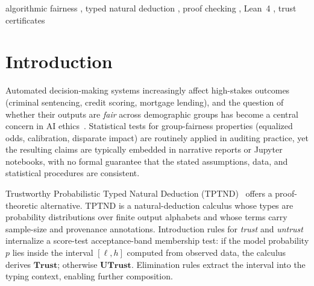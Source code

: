 \documentclass{ceurart}
\newcommand{\Trust}{\textbf{Trust}}
\newcommand{\UTrust}{\textbf{UTrust}}
\begin{document}
\begin{keywords}
algorithmic fairness \sep
typed natural deduction \sep
proof checking \sep
Lean~4 \sep
trust certificates
\end{keywords}

\maketitle

\section{Introduction}\label{sec:intro}

Automated decision-making systems increasingly affect high-stakes
outcomes (criminal sentencing, credit scoring, mortgage lending),
and the question of whether their outputs are \emph{fair} across
demographic groups has become a central concern in AI
ethics~\cite{barocas2019fairness}.
Statistical tests for group-fairness properties (equalized odds,
calibration, disparate impact) are routinely applied in auditing
practice, yet the resulting claims are typically embedded in
narrative reports or Jupyter notebooks, with no formal guarantee
that the stated assumptions, data, and statistical procedures
are consistent.

Trustworthy Probabilistic Typed Natural Deduction
(TPTND)~\cite{dasaro2025tptnd} offers a proof-theoretic alternative.
TPTND is a natural-deduction calculus whose types are probability
distributions over finite output alphabets and whose terms carry
sample-size and provenance annotations.
Introduction rules for \emph{trust} and \emph{untrust} internalize
a score-test acceptance-band membership test: if the model probability $p$
lies inside the interval $[\ell,h]$ computed from observed data, the
calculus derives $\Trust$; otherwise $\UTrust$.
Elimination rules extract the interval into the typing context,
enabling further composition.
\end{document}
